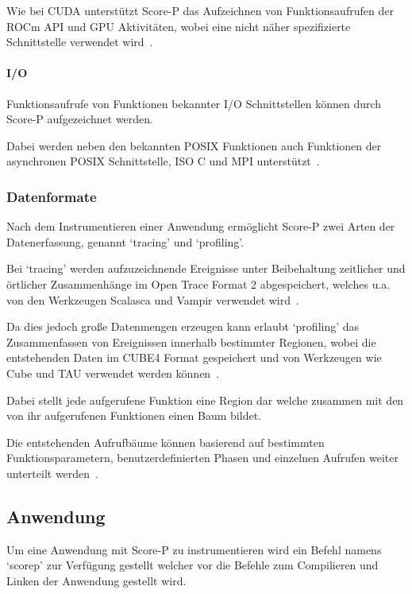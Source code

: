 \documentclass[german,proseminar,hyperref,utf8]{zihpub}
\begin{document}
    Wie bei CUDA unterstützt Score-P das Aufzeichnen von Funktionsaufrufen der ROCm API und GPU Aktivitäten,
    wobei eine nicht näher spezifizierte Schnittstelle verwendet wird~.

    \paragraph{I/O}
    Funktionsaufrufe von Funktionen bekannter I/O Schnittstellen können durch Score-P aufgezeichnet werden.

    Dabei werden neben den bekannten POSIX Funktionen auch Funktionen der asynchronen POSIX Schnittstelle,
    ISO C und MPI unterstützt~.

    \subsubsection{Datenformate}
    Nach dem Instrumentieren einer Anwendung ermöglicht Score-P zwei Arten der Datenerfassung,
    genannt `tracing' und `profiling'.

    Bei `tracing' werden aufzuzeichnende Ereignisse unter Beibehaltung zeitlicher und örtlicher
    Zusammenhänge im Open Trace Format 2 abgespeichert, welches u.a. von den Werkzeugen Scalasca
    und Vampir verwendet wird~.

    Da dies jedoch gro{\ss}e Datenmengen erzeugen kann erlaubt `profiling' das Zusammenfassen von
    Ereignissen innerhalb bestimmter Regionen, wobei die entstehenden Daten im CUBE4 Format
    gespeichert und von Werkzeugen wie Cube und TAU verwendet werden
    können~.

    Dabei stellt jede aufgerufene Funktion eine Region dar welche zusammen mit den von ihr
    aufgerufenen Funktionen einen Baum bildet.

    Die entstehenden Aufrufbäume können basierend auf bestimmten Funktionsparametern,
    benutzerdefinierten Phasen und einzelnen Aufrufen weiter unterteilt
    werden~.

    \subsection{Anwendung}
    Um eine Anwendung mit Score-P zu instrumentieren wird ein Befehl namens `scorep' zur Verfügung
    gestellt welcher vor die Befehle zum Compilieren und Linken der Anwendung gestellt wird.
\end{document}
